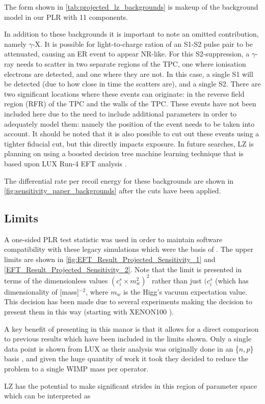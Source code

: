 The form shown in \autoref{tab:projected_lz_backgrounds} is makeup of the background model in our PLR with 11 components.
\par
In addition to these backgrounds it is important to note an omitted contribution, namely $\gamma$-X.
It is possible for light-to-charge ration of an S1-S2 pulse pair to be attenuated, causing an ER event to appear NR-like.
For this S2-suppression, a $\gamma$-ray needs to scatter in two separate regions of the TPC, one where ionisation electrons are detected, and one where they are not.
In this case, a single S1 will be detected (due to how close in time the scatters are), and a single S2.
There are two significant locations where these events can originate: in the reverse field region (RFR) of the TPC and the walls of the TPC.
These events have not been included here due to the need to include additional parameters in order to adequately model them: namely the position of the event needs to be taken into account.
It should be noted that it is also possible to cut out these events using a tighter fiducial cut, but this directly impacts exposure.
In future searches, LZ is planning on using a boosted decision tree machine learning technique that is based upon LUX Run-4 EFT analysis \cite{LUX_RUN4_EFT_2021}.
\par
The differential rate per recoil energy for these backgrounds are shown in \autoref{fig:sensitivity_paper_backgrounds} after the cuts have been applied.



\subsection{Limits}
\par
A one-sided PLR test statistic was used in order to maintain software compatibility with these legacy simulations which were the basis of \cite{LZ_projected_sensitivity_paper_ref}.
The upper limits are shown in \autoref{fig:EFT_Result_Projected_Sensitivity_1} and \autoref{EFT_Result_Projected_Sensitivity_2}.
Note that the limit is presented in terms of the dimensionless values $({c}^{s}_{i}\times{m}^{2}_{w})^{2}$ rather than just $({c}^{s}_{i}$ (which has dimensionality of [mass]$^{-2}$, where $m_w$ is the Higg's vacuum expectation value.
This decision has been made due to several experiments making the decision to present them in this way (starting with XENON100 \cite{xenon100_eft_ref}).
\par
A key benefit of presenting in this manor is that it allows for a direct comparison to previous results which have been included in the limits shown.
Only a single data point is shown from LUX as their analysis was originally done in an \{$n,p$\} basis \cite{LUX_RUN4_EFT_2021}, and given the huge quantity of work it took they decided to reduce the problem to a single WIMP mass per operator.
\par
LZ has the potential to make significant strides in this region of parameter space which can be interpreted as 


